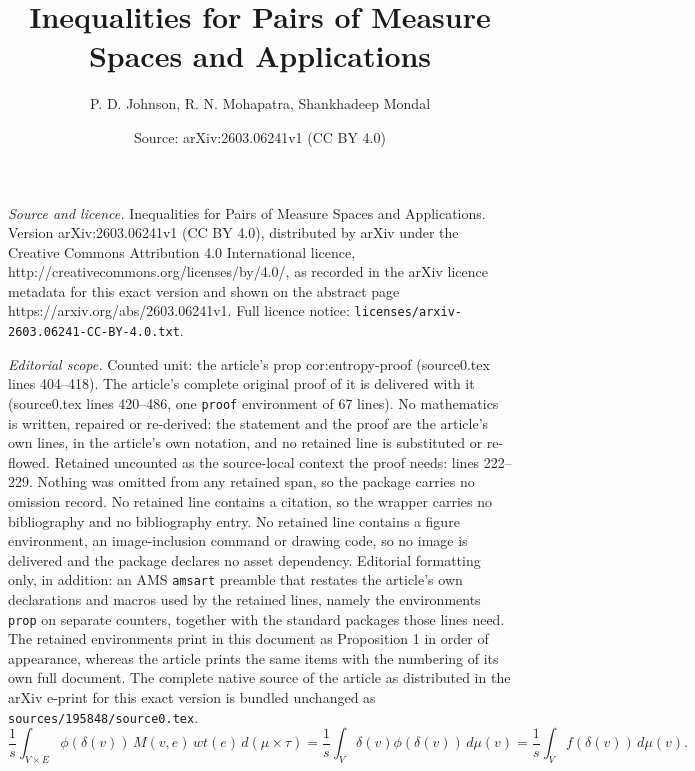 \documentclass[10pt,a4paper]{amsart}
\title{Inequalities for Pairs of Measure Spaces and Applications}
\author{P. D. Johnson, R. N. Mohapatra, Shankhadeep Mondal}
\date{Source: arXiv:2603.06241v1 (CC BY 4.0)}
\begin{document}
\maketitle

\noindent\emph{Source and licence.} Inequalities for Pairs of Measure Spaces and Applications. Version arXiv:2603.06241v1 (CC BY 4.0), distributed by arXiv under the Creative Commons Attribution 4.0 International licence, http://creativecommons.org/licenses/by/4.0/, as recorded in the arXiv licence metadata for this exact version and shown on the abstract page https://arxiv.org/abs/2603.06241v1. Full licence notice: \texttt{licenses/arxiv-2603.06241-CC-BY-4.0.txt}.\par\smallskip

\noindent\textit{Editorial scope.} Counted unit: the article's prop cor:entropy-proof (source0.tex lines 404--418). The article's complete original proof of it is delivered with it (source0.tex lines 420--486, one \texttt{proof} environment of 67 lines). No mathematics is written, repaired or re-derived: the statement and the proof are the article's own lines, in the article's own notation, and no retained line is substituted or re-flowed.  Retained uncounted as the source-local context the proof needs: lines 222--229.  Nothing was omitted from any retained span, so the package carries no omission record.  No retained line contains a citation, so the wrapper carries no bibliography and no bibliography entry.  No retained line contains a figure environment, an image-inclusion command or drawing code, so no image is delivered and the package declares no asset dependency.  Editorial formatting only, in addition: an AMS \texttt{amsart} preamble that restates the article's own declarations and macros used by the retained lines, namely the environments \texttt{prop} on separate counters, together with the standard packages those lines need.  The retained environments print in this document as Proposition 1 in order of appearance, whereas the article prints the same items with the numbering of its own full document.  The complete native source of the article as distributed in the arXiv e-print for this exact version is bundled unchanged as \texttt{sources/195848/source0.tex}.
\begin{equation}
\label{eq:key-identity}
\frac{1}{s}\int_{V\times E}\phi(\delta(v))\,M(v,e)\,wt(e)\,d(\mu\times\tau)
=
\frac{1}{s}\int_V \delta(v)\phi(\delta(v))\,d\mu(v)
=
\frac{1}{s}\int_V f(\delta(v))\,d\mu(v).
\end{equation}
\end{document}
